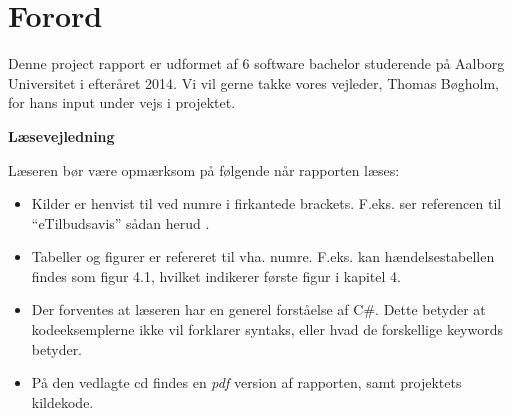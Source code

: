 \chapter*{Forord}

Denne project rapport er udformet af 6 software bachelor studerende på Aalborg Universitet i efteråret 2014.
Vi vil gerne takke vores vejleder, Thomas Bøgholm, for hans input under vejs i projektet.

\textbf{Læsevejledning}

Læseren bør være opmærksom på følgende når rapporten læses:

\begin{itemize}
	\item Kilder er henvist til ved numre i firkantede brackets. 
	F.eks. ser referencen til ``eTilbudsavis'' sådan herud \citep{eTilAPI}.
	\item Tabeller og figurer er refereret til vha. numre. F.eks. kan hændelsestabellen findes som figur 4.1, hvilket indikerer første figur i kapitel 4.
	\item Der forventes at læseren har en generel forståelse af C\#. Dette betyder at kodeeksemplerne ikke vil forklarer syntaks, eller hvad de forskellige keywords betyder.
	\item På den vedlagte cd findes en \textit{pdf} version af rapporten, samt projektets kildekode. 
\end{itemize}